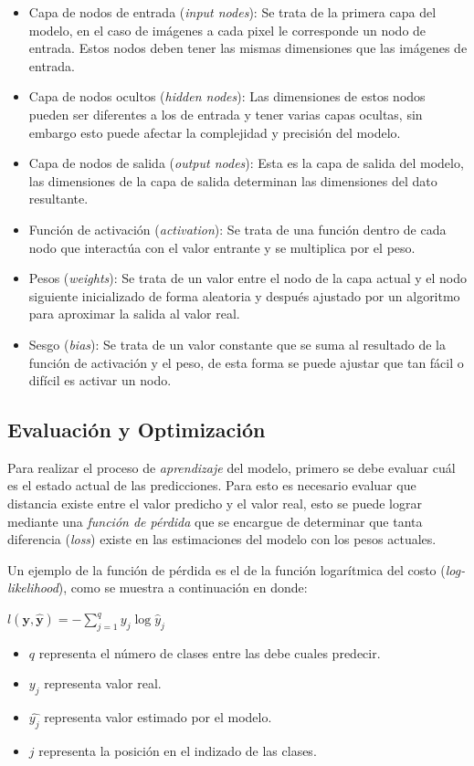\begin{itemize}
    \item Capa de nodos de entrada (\emph{input nodes}): Se trata de la primera capa del modelo, en el caso de imágenes a cada pixel le corresponde un nodo de entrada. Estos nodos deben tener las mismas dimensiones que las imágenes de entrada.
    \item Capa de nodos ocultos (\emph{hidden nodes}): Las dimensiones de estos nodos pueden ser diferentes a los de entrada y tener varias capas ocultas, sin embargo esto puede afectar la complejidad y precisión del modelo.
    \item Capa de nodos de salida (\emph{output nodes}): Esta es la capa de salida del modelo, las dimensiones de la capa de salida determinan las dimensiones del dato resultante.
    \item Función de activación (\emph{activation}): Se trata de una función dentro de cada nodo que interactúa con el valor entrante y se multiplica por el peso.
    \item Pesos (\emph{weights}): Se trata de un valor entre el nodo de la capa actual y el nodo siguiente inicializado de forma aleatoria y después ajustado por un algoritmo para aproximar la salida al valor real.
    \item Sesgo (\emph{bias}): Se trata de un valor constante que se suma al resultado de la función de activación y el peso, de esta forma se puede ajustar que tan fácil o difícil es activar un nodo.
\end{itemize}


\subsection{Evaluación y Optimización}
Para realizar el proceso de \emph{aprendizaje} del modelo, primero se debe evaluar cuál es el estado actual de las predicciones. Para esto es necesario evaluar que distancia existe entre el valor predicho y el valor real, esto se puede lograr mediante una \emph{función de pérdida} que se encargue de determinar que tanta diferencia (\emph{loss}) existe en las estimaciones del modelo con los pesos actuales.

Un ejemplo de la función de pérdida es el de la función logarítmica del costo (\emph{log-likelihood}), como se muestra a continuación en donde:

$l(\mathbf{y}, \hat{\mathbf{y}}) = - \sum_{j=1}^q y_j \log \hat{y}_j$ 

\begin{itemize}
    \item $q$ representa el número de clases entre las debe cuales predecir.
    \item $y_j$ representa valor real.
    \item $\hat{y_j}$ representa valor estimado por el modelo.
    \item $j$ representa la posición en el indizado de las clases.
\end{itemize}

